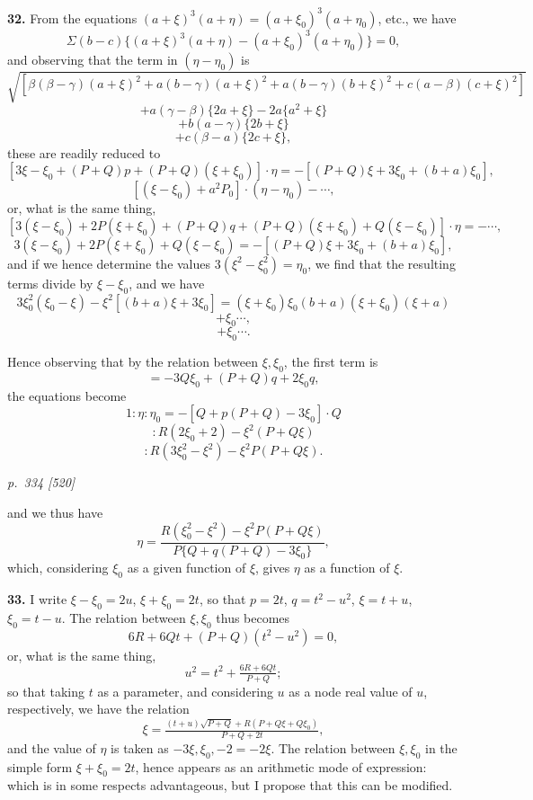 \documentclass[11pt,a4paper]{book}
\begin{document}
\textbf{32.} From the equations $(a + \xi)^3 (a + \eta) = (a + \xi_0)^3 (a + \eta_0)$, etc., we have
\[
\Sigma (b - c)\{(a + \xi)^3 (a + \eta) - (a + \xi_0)^3 (a + \eta_0)\} = 0,
\]
and observing that the term in $(\eta - \eta_0)$ is
\[
\sqrt{[\beta(\beta - \gamma)(a + \xi)^2 + a(b - \gamma)(a + \xi)^2 + a(b - \gamma)(b + \xi)^2 + c(a - \beta)(c + \xi)^2]}
\]
\[
+ a(\gamma - \beta)\{2a + \xi\} - 2a\{a^2 + \xi\}
\]
\[
+ b(a - \gamma)\{2b + \xi\}
\]
\[
+ c(\beta - a)\{2c + \xi\},
\]
these are readily reduced to
\[
[3\xi - \xi_0 + (P + Q)p + (P + Q)(\xi + \xi_0)] \cdot \eta = -[(P + Q)\xi + 3\xi_0 + (b + a)\xi_0],
\]
\[
[(\xi - \xi_0) + a^2 P_0]\cdot (\eta - \eta_0) - \cdots,
\]
or, what is the same thing,
\[
[3(\xi - \xi_0) + 2P(\xi + \xi_0) + (P + Q)q + (P + Q)(\xi + \xi_0) + Q(\xi - \xi_0)] \cdot \eta = -\cdots,
\]
\[
3(\xi - \xi_0) + 2P(\xi + \xi_0) + Q(\xi - \xi_0) = -[(P + Q)\xi + 3\xi_0 + (b + a)\xi_0],
\]
and if we hence determine the values $3(\xi^2 - \xi_0^2) = \eta_0$, we find that the resulting terms divide by $\xi - \xi_0$, and we have
\[
3\xi_0^2(\xi_0 - \xi) - \xi^2[(b + a)\xi + 3\xi_0] = (\xi + \xi_0)\xi_0(b + a)(\xi + \xi_0)(\xi + a)
\]
\[
+ \xi_0 \cdots,
\]
\[
+ \xi_0 \cdots.
\]

Hence observing that by the relation between $\xi, \xi_0$, the first term is
\[
= -3Q\xi_0 + (P + Q)q + 2\xi_0 q,
\]
the equations become
\[
1: \eta : \eta_0 = -[Q + p(P + Q) - 3\xi_0] \cdot Q
\]
\[
: R(2\xi_0 + 2) - \xi^2(P + Q\xi)
\]
\[
: R(3\xi_0^2 - \xi^2) - \xi^2 P(P + Q\xi).
\]

\clearpage

\bigskip
\textit{p.~334 [520]}
\smallskip

and we thus have
\[
\eta = \frac{R(\xi_0^2 - \xi^2) - \xi^2 P(P + Q\xi)}{P\{Q + q(P + Q) - 3\xi_0\}},
\]
which, considering $\xi_0$ as a given function of $\xi$, gives $\eta$ as a function of $\xi$.

\textbf{33.} I write $\xi - \xi_0 = 2u$, $\xi + \xi_0 = 2t$, so that $p = 2t$, $q = t^2 - u^2$, $\xi = t + u$, $\xi_0 = t - u$. The relation between $\xi, \xi_0$ thus becomes
\[
6R + 6Qt + (P + Q)(t^2 - u^2) = 0,
\]
or, what is the same thing,
\[
u^2 = t^2 + \tfrac{6R + 6Qt}{P + Q};
\]
so that taking $t$ as a parameter, and considering $u$ as a node real value of $u$, respectively, we have the relation
\[
\xi = \tfrac{(t + u)\sqrt{P + Q} + R(P + Q\xi + Q\xi_0)}{P + Q + 2t},
\]
and the value of $\eta$ is taken as $-3\xi, \xi_0, -2 = -2\xi$. The relation between $\xi, \xi_0$ in the simple form $\xi + \xi_0 = 2t$, hence appears as an arithmetic mode of expression: which is in some respects advantageous, but I propose that this can be modified.
\end{document}
